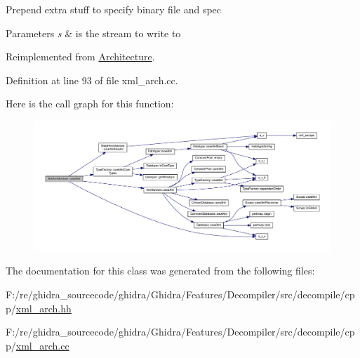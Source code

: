 Prepend extra stuff to specify binary file and spec 
\begin{DoxyParams}{Parameters}
{\em s} & is the stream to write to \\
\hline
\end{DoxyParams}


Reimplemented from \mbox{\hyperlink{class_architecture_af760a127622d4cdd4b6b436122478cb5}{Architecture}}.



Definition at line 93 of file xml\+\_\+arch.\+cc.

Here is the call graph for this function\+:
\nopagebreak
\begin{figure}[H]
\begin{center}
\leavevmode
\includegraphics[width=350pt]{class_xml_architecture_abf5dd16b5343f89d2b165cf2206c7bf6_cgraph}
\end{center}
\end{figure}


The documentation for this class was generated from the following files\+:\begin{DoxyCompactItemize}
\item 
F\+:/re/ghidra\+\_\+sourcecode/ghidra/\+Ghidra/\+Features/\+Decompiler/src/decompile/cpp/\mbox{\hyperlink{xml__arch_8hh}{xml\+\_\+arch.\+hh}}\item 
F\+:/re/ghidra\+\_\+sourcecode/ghidra/\+Ghidra/\+Features/\+Decompiler/src/decompile/cpp/\mbox{\hyperlink{xml__arch_8cc}{xml\+\_\+arch.\+cc}}\end{DoxyCompactItemize}
